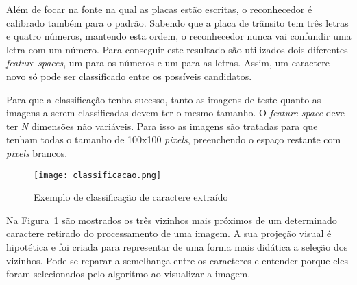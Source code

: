Além de focar na fonte na qual as placas estão escritas, o reconhecedor é calibrado também para o padrão. Sabendo que a placa de trânsito tem três letras e quatro números, mantendo esta ordem, o reconhecedor nunca vai confundir uma letra com um número. Para conseguir este resultado são utilizados dois diferentes \emph{feature spaces}, um para os números e um para as letras. Assim, um caractere novo só pode ser classificado entre os possíveis candidatos.

Para que a classificação tenha sucesso, tanto as imagens de teste quanto as imagens a serem classificadas devem ter o mesmo tamanho. O \emph{feature space} deve ter \emph{N} dimensões não variáveis. Para isso as imagens são tratadas para que tenham todas o tamanho de 100x100 \emph{pixels}, preenchendo o espaço restante com \emph{pixels} brancos.

\begin{figure}[H]
	\centering
	\texttt{[image: classificacao.png]}
	\caption{Exemplo de classificação de caractere extraído}
	\label{fig:classificacao}
\end{figure}

Na Figura~\ref{fig:classificacao} são mostrados os três vizinhos mais próximos de um determinado caractere retirado do processamento de uma imagem. A sua projeção visual é hipotética e foi criada para representar de uma forma mais didática a seleção dos vizinhos. Pode-se reparar a semelhança entre os caracteres e entender porque eles foram selecionados pelo algoritmo ao visualizar a imagem.
